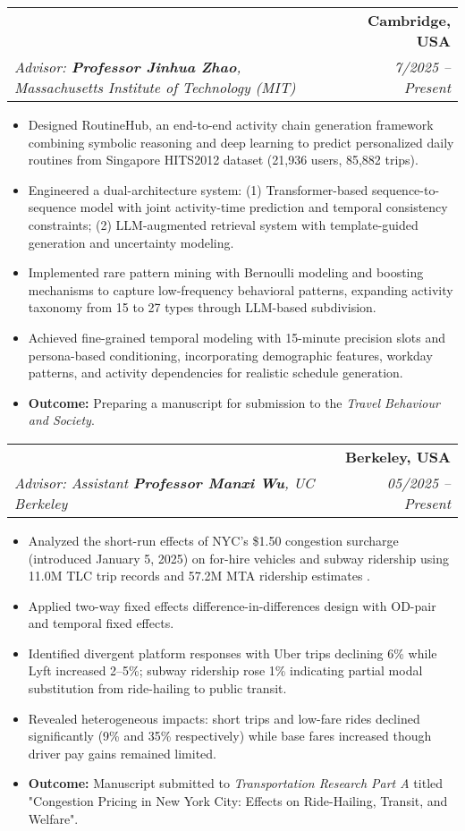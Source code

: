 \documentclass[letterpaper,11pt]{article}
\makeatletter
\newcommand{\resumeItem}[1]{
  \item\small{
    {#1 \vspace{-2pt}}
  }
}
\newcommand{\resumeSubheading}[4]{
  \vspace{-2pt}\item
    \begin{tabular*}{1.0\textwidth}[t]{l@{\extracolsep{\fill}}r}
      \textbf{#1} & \textbf{\small #2} \\
      \textit{\small#3} & \textit{\small #4} \\
    \end{tabular*}\vspace{-7pt}
}
\newcommand{\resumeItemListStart}{\begin{itemize}}
\newcommand{\resumeItemListEnd}{\end{itemize}\vspace{-5pt}}
\makeatother
\begin{document}
\resumeSubheading
{\makebox[0.6\textwidth][l]{\textbf{\textls[-0]{RoutineHub: A Framework for Persona-Conditioned Activity Chain Generation}}}}{Cambridge, USA}
{\textit{Advisor: \textbf{Professor Jinhua Zhao}, Massachusetts Institute of Technology (MIT)} }{\textit{7/2025 -- Present}}
\resumeItemListStart
\resumeItem{Designed RoutineHub, an end-to-end activity chain generation framework combining symbolic reasoning and deep learning to predict personalized daily routines from Singapore HITS2012 dataset (21,936 users, 85,882 trips).}
 \resumeItem{Engineered a dual-architecture system: (1) Transformer-based sequence-to-sequence model with joint activity-time prediction and temporal consistency constraints; (2) LLM-augmented retrieval system with template-guided generation and uncertainty modeling.}

\resumeItem{Implemented rare pattern mining with Bernoulli modeling and boosting mechanisms to capture low-frequency behavioral patterns, expanding activity taxonomy from 15 to 27 types through LLM-based subdivision.}

\resumeItem{Achieved fine-grained temporal modeling with 15-minute precision slots and persona-based conditioning, incorporating demographic features, workday patterns, and activity dependencies for realistic schedule generation.}
    \resumeItem{\textbf{Outcome:} Preparing a manuscript for submission to the \textit{Travel Behaviour and Society}.}   
\resumeItemListEnd
\vspace{-5pt}

\resumeSubheading
{\makebox[0.6\textwidth][l]{\textbf{\textls[-0]{Impact of Congestion Pricing on Ride-hailing and Subway in New York City}}}}{Berkeley, USA}
{\textit{Advisor: Assistant \textbf{Professor Manxi Wu}, UC Berkeley}}{\textit{05/2025 -- Present}}
\resumeItemListStart
    \resumeItem{Analyzed the short-run effects of NYC's \$1.50 congestion surcharge (introduced January 5, 2025) on for-hire vehicles and subway ridership using 11.0M TLC trip records and 57.2M MTA ridership estimates}.
    \resumeItem{Applied two-way fixed effects difference-in-differences design with OD-pair and temporal fixed effects.}
    \resumeItem{Identified divergent platform responses with Uber trips declining 6\% while Lyft increased 2--5\%; subway ridership rose 1\% indicating partial modal substitution from ride-hailing to public transit.}
    \resumeItem{Revealed heterogeneous impacts: short trips and low-fare rides declined significantly (9\% and 35\% respectively) while base fares increased though driver pay gains remained limited.}
    \resumeItem{\textbf{Outcome:} Manuscript submitted to \textit{Transportation Research Part A} titled "Congestion Pricing in New York City: Effects on Ride-Hailing, Transit, and Welfare".}
\resumeItemListEnd
\vspace{-5pt}
\end{document}
